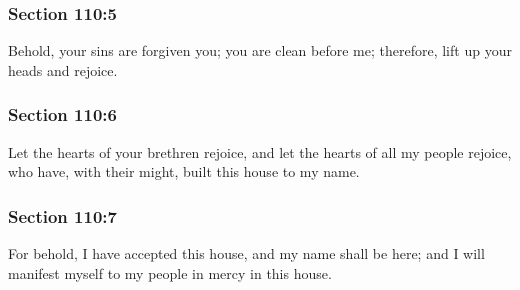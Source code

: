 	\subsubsection{Section 110:5} %
		\label{DC110-5}

		Behold, your sins are forgiven you; you are clean before me; therefore, lift up your heads and rejoice.


	\subsubsection{Section 110:6} %
		\label{DC110-6}

		Let the hearts of your brethren rejoice, and let the hearts of all my people rejoice, who have, with their might, built this house to my name.


	\subsubsection{Section 110:7} %
		\label{DC110-7}

		For behold, I have accepted this house, and my name shall be here; and I will manifest myself to my people in mercy in this house.


